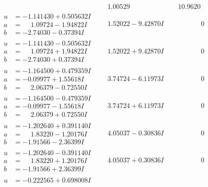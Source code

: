 \documentclass[1p]{elsarticle_modified}
\theoremstyle{definition}
\begin{document}
$$\begin{array}{c|c|c}
 & \phantom{-}1.00529\phantom{ +0.000000I} & \phantom{-}10.9620\phantom{ +0.000000I} \\ \hline\begin{aligned}
u &= -1.141430 + 0.505632 I \\
a &= \phantom{-}1.09724 - 1.94822 I \\
b &= -2.74030 - 0.37394 I\end{aligned}
 & \phantom{-}1.52022 - 9.42870 I & \phantom{-0.000000 } 0 \\ \hline\begin{aligned}
u &= -1.141430 - 0.505632 I \\
a &= \phantom{-}1.09724 + 1.94822 I \\
b &= -2.74030 + 0.37394 I\end{aligned}
 & \phantom{-}1.52022 + 9.42870 I & \phantom{-0.000000 } 0 \\ \hline\begin{aligned}
u &= -1.164500 + 0.479359 I \\
a &= -0.09977 + 1.55618 I \\
b &= \phantom{-}2.06379 - 0.72550 I\end{aligned}
 & \phantom{-}3.74724 - 6.11973 I & \phantom{-0.000000 } 0 \\ \hline\begin{aligned}
u &= -1.164500 - 0.479359 I \\
a &= -0.09977 - 1.55618 I \\
b &= \phantom{-}2.06379 + 0.72550 I\end{aligned}
 & \phantom{-}3.74724 + 6.11973 I & \phantom{-0.000000 } 0 \\ \hline\begin{aligned}
u &= -1.202640 + 0.391140 I \\
a &= \phantom{-}1.83220 - 1.20176 I \\
b &= -1.91566 - 2.36399 I\end{aligned}
 & \phantom{-}4.05037 - 0.30836 I & \phantom{-0.000000 } 0 \\ \hline\begin{aligned}
u &= -1.202640 - 0.391140 I \\
a &= \phantom{-}1.83220 + 1.20176 I \\
b &= -1.91566 + 2.36399 I\end{aligned}
 & \phantom{-}4.05037 + 0.30836 I & \phantom{-0.000000 } 0 \\ \hline\begin{aligned}
u &= -0.222565 + 0.698008 I \\

\end{aligned}
\end{array}$$
\end{document}
